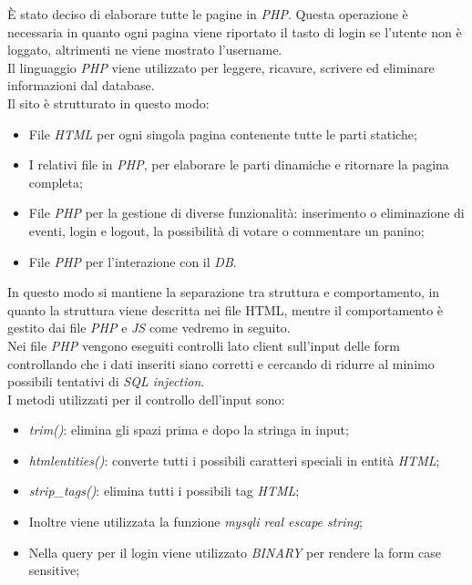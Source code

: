 È stato deciso di elaborare tutte le pagine in \emph{PHP}. Questa operazione è necessaria in quanto ogni 
pagina viene riportato il tasto di login se l'utente non è loggato, altrimenti ne viene mostrato l'username.\\
Il linguaggio \emph{PHP} viene utilizzato per leggere, ricavare, scrivere ed eliminare informazioni dal database.\\
Il sito è strutturato in questo modo: 
\begin{itemize}
    \item File \emph{HTML} per ogni singola pagina contenente tutte le parti statiche;
    \item I relativi file in \emph{PHP}, per elaborare le parti dinamiche e ritornare la pagina completa;
    \item File \emph{PHP} per la gestione di diverse funzionalità: inserimento o eliminazione di eventi, login e logout, la possibilità di votare o commentare un panino;
    \item File \emph{PHP} per l'interazione con il \emph{DB}.
\end{itemize}
In questo modo si mantiene la separazione tra struttura e comportamento, in quanto la struttura viene descritta nei file HTML, mentre il comportamento è gestito dai file \emph{PHP} e \emph{JS} come vedremo in seguito.\\

Nei file \emph{PHP} vengono eseguiti controlli lato client sull'input delle form controllando che i dati inseriti siano corretti e cercando di ridurre al minimo possibili tentativi di \emph{SQL injection}.\\
I metodi utilizzati per il controllo dell'input sono: 
    \begin{itemize}
        \item \emph{trim()}: elimina gli spazi prima e dopo la stringa in input;
        \item \emph{htmlentities()}: converte tutti i possibili caratteri speciali in entità \emph{HTML};
        \item \emph{strip\_tags()}: elimina tutti i possibili tag \emph{HTML};
        \item Inoltre viene utilizzata la funzione \emph{mysqli real escape string};
        \item Nella query per il login viene utilizzato \emph{BINARY} per rendere la form case sensitive;
    \end{itemize}